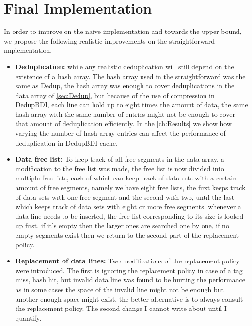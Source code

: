\section{Final Implementation}
\label{sec:Final Implementation}
In order to improve on the naive implementation and towards the upper bound, we propose the following realistic improvements on the straightforward implementation.
\begin{itemize}
    \item \textbf{Deduplication:} while any realistic deduplication will still depend on the existence of a hash array. The hash array used in the straightforward was the same as \hyperref[sssec:DedupHash]{Dedup}, the hash array was enough to cover deduplications in the data array of \ref{sec:Dedup}, but because of the use of compression in DedupBDI, each line can hold up to eight times the amount of data, the same hash array with the same number of entries might not be enough to cover that amount of deduplication efficiently. In the \ref{ch:Results} we show how varying the number of hash array entries can affect the performance of deduplication in DedupBDI cache.
    \item \textbf{Data free list:} To keep track of all free segments in the data array, a modification to the free list was made, the free list is now divided into multiple free lists, each of which can keep track of data sets with a certain amount of free segments, namely we have eight free lists, the first keeps track of data sets with one free segment and the second with two, until the last which keeps track of data sets with eight or more free segments, whenever a data line needs to be inserted, the free list corresponding to its size is looked up first, if it's empty then the larger ones are searched one by one, if no empty segments exist then we return to the second part of the replacement policy.
    \item \textbf{Replacement of data lines:} Two modifications of the replacement policy were introduced. The first is ignoring the replacement policy in case of a tag miss, hash hit, but invalid data line was found to be hurting the performance as in some cases the space of the invalid line might not be enough but another enough space might exist, the better alternative is to always consult the replacement policy. The second change I cannot write about until I quantify.
\end{itemize}
